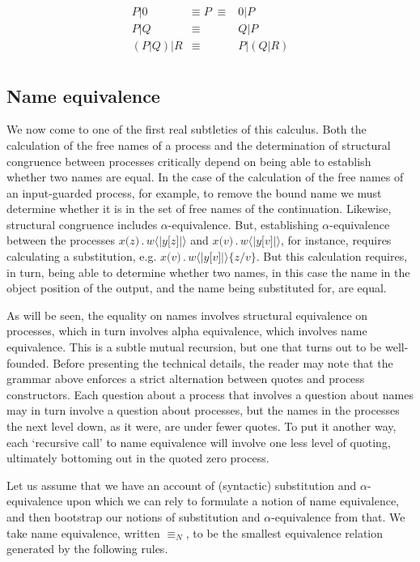 \documentclass[]{amsart}
\newcommand{\lliftb}{\langle\!|}
\newcommand{\rliftb}{|\!\rangle}
\newcommand{\id}[1]{\texttt{#1}}
\newcommand{\pzero}{\mathbin{0}}
\newcommand{\juxtap}{\mathbin{\id{|}}}
\newcommand{\concat}{\mathbin{.}}
\newcommand{\scong}{\mathbin{\equiv}}
\newcommand{\nameeq}{\mathbin{\equiv_N}}
\newcommand{\lift}[2]{#1 \lliftb #2 \rliftb}
\theoremstyle{definition}
\theoremstyle{remark}
\numberwithin{equation}{subsection}
\begin{document}
\begin{eqnarray*}
	{P} \juxtap \pzero	
		&  \scong \; {P} \; \scong & 
			\pzero \juxtap {P} \\
	{P} \juxtap {Q}	
		& \scong & 
			{Q} \juxtap {P} \\
	({P} \juxtap {Q}) \juxtap {R}
		& \scong & 
			{P} \juxtap ({Q} \juxtap {R}) \\
\end{eqnarray*}

\subsection{Name equivalence}

We now come to one of the first real subtleties of this calculus. Both
the calculation of the free names of a process and the determination
of structural congruence between processes critically depend on being
able to establish whether two names are equal. In the case of the
calculation of the free names of an input-guarded process, for
example, to remove the bound name we must determine whether it is in
the set of free names of the continuation. Likewise, structural
congruence includes $\alpha$-equivalence. But, establishing
$\alpha$-equivalence between the processes $x \id{(} z \id{)}\concat \lift{w}{y
\id{[}z\id{]}}$ and $x \id{(} v \id{)}\concat \lift{w}{y
\id{[}v\id{]}}$, for instance, requires calculating a substitution, e.g. $x \id{(} v \id{)}\concat \lift{w}{y
\id{[}v\id{]}} \id{\{}z / v \id{\}}$. But this calculation requires, in turn, being able to
determine whether two names, in this case the name in the object
position of the output, and the name being substituted for, are equal.

As will be seen, the equality on names involves structural equivalence
on processes, which in turn involves alpha equivalence, which involves
name equivalence. This is a subtle mutual recursion, but one that
turns out to be well-founded. Before presenting the technical details,
the reader may note that the grammar above enforces a strict
alternation between quotes and process constructors. Each question
about a process that involves a question about names may in turn
involve a question about processes, but the names in the processes the
next level down, as it were, are under fewer quotes. To put it another
way, each `recursive call' to name equivalence will involve one less
level of quoting, ultimately bottoming out in the quoted zero process.

Let us assume that we have an account of (syntactic) substitution and
$\alpha$-equivalence upon which we can rely to formulate a notion of
name equivalence, and then bootstrap our notions of substitution and
$\alpha$-equivalence from that. We take name equivalence, written
$\nameeq$, to be the smallest equivalence relation generated by the
following rules.
\end{document}
